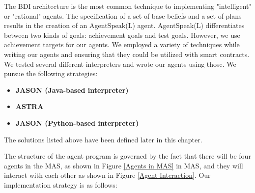 \vspace{.5cm}

The \ac{BDI} architecture is the most common technique to implementing "intelligent" or "rational" agents. The specification of a set of base beliefs and a set of plans results in the creation of an AgentSpeak(L) agent. AgentSpeak(L) differentiates between two kinds of goals: achievement goals and test goals. However, we use achievement targets for our agents. We employed a variety of techniques while writing our agents and ensuring that they could be utilized with smart contracts. We tested several different interpreters and wrote our agents using those. We pursue the following strategies:

 \vspace{.5cm}
 
\begin{itemize}
    \item \textbf{JASON (Java-based interpreter)}
    
    \vspace{.5cm}
    
    \item \textbf{ASTRA}
    
    \vspace{.5cm}
    
    \item \textbf{JASON (Python-based interpreter)}
    
     \vspace{.5cm}
\end{itemize}

The solutions listed above have been defined later in this chapter.

\vspace{.5cm }

The structure of the agent program is governed by the fact that there will be four agents in the \ac{MAS}, as shown in Figure \ref{Agents in MAS} in MAS, and they will interact with each other as shown in Figure \ref{Agent Interaction}. Our implementation strategy is as follows:

